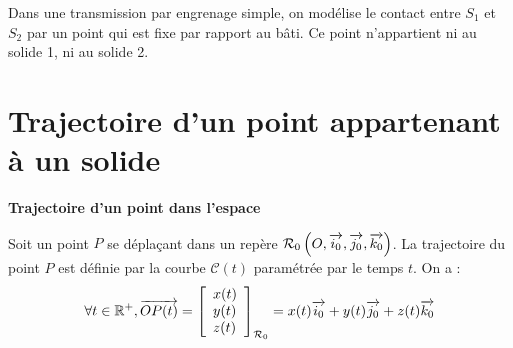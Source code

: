 \documentclass[10pt,oneside]{article}
\begin{document}
\begin{minipage}[c]{.23\linewidth}
Dans une transmission par engrenage simple, on modélise le contact entre $S_1$ et $S_2$ par un point qui est fixe par rapport au bâti. Ce point n'appartient ni au solide 1, ni au solide 2.
\end{minipage}


\section{Trajectoire d'un point appartenant à un solide}


\begin{defi}
\textbf{Trajectoire d'un point dans l'espace}

Soit un point $P$ se déplaçant dans un repère $\mathcal{R}_0 \left(O,\overrightarrow{i_0},\overrightarrow{j_0},\overrightarrow{k_0} \right)$. La trajectoire du point $P$ est définie par la courbe $\mathcal{C}(t)$ paramétrée par le temps $t$. On a : 
$$
\forall t\in \mathbb{R}^+, \overrightarrow{OP(t)}=
\left[
\begin{array}{l}
x(t)\\
y(t)\\
z(t)\\
\end{array}
\right]_{\mathcal{R}_0}
=x(t)\overrightarrow{i_0}+y(t)\overrightarrow{j_0}+z(t)\overrightarrow{k_0}
$$
\end{defi}
\end{document}

